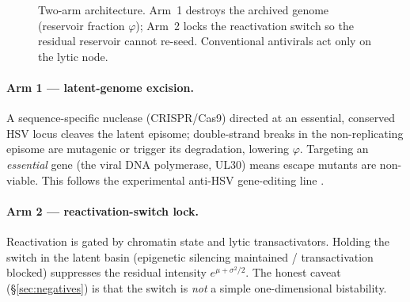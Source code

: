 \documentclass[11pt,a4paper]{article}
\begin{document}
\begin{figure}[h]
\centering
{}
\caption{Two-arm architecture. Arm~1 destroys the archived genome (reservoir
fraction $\varphi$); Arm~2 locks the reactivation switch so the residual
reservoir cannot re-seed. Conventional antivirals act only on the lytic node.}
\label{fig:arch}
\end{figure}

\paragraph{Arm 1 --- latent-genome excision.}
A sequence-specific nuclease (CRISPR/Cas9) directed at an essential, conserved
HSV locus cleaves the latent episome; double-strand breaks in the non-replicating
episome are mutagenic or trigger its degradation, lowering $\varphi$. Targeting
an \emph{essential} gene (the viral DNA polymerase, UL30) means escape mutants
are non-viable. This follows the experimental anti-HSV gene-editing line
\citep{vandiemen2016,aubert2020}.

\paragraph{Arm 2 --- reactivation-switch lock.}
Reactivation is gated by chromatin state and lytic transactivators. Holding the
switch in the latent basin (epigenetic silencing maintained / transactivation
blocked) suppresses the residual intensity $e^{\mu+\sigma^2/2}$. The honest
caveat (\S\ref{sec:negatives}) is that the switch is \emph{not} a simple
one-dimensional bistability.
\end{document}
